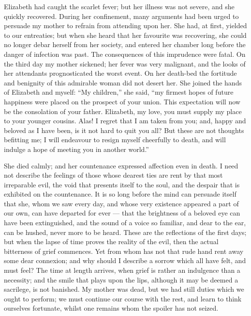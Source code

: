 Elizabeth had caught the scarlet
fever; but her illness was not severe,
and she quickly recovered. During
her confinement, many arguments had
been urged to persuade my mother to
refrain from attending upon her. She
had, at first, yielded to our entreaties;
but when she heard that her favourite
was recovering, she could no longer
debar herself from her society, and entered
her chamber long before the danger
of infection was past. The consequences
of this imprudence were fatal.
On the third day my mother sickened;
her fever was very malignant,
and the looks of her attendants prognosticated
the worst event. On her
death-bed the fortitude and benignity
of this admirable woman did not
desert her. She joined the hands of
Elizabeth and myself: ``My children,''
she said, ``my firmest hopes of future
happiness were placed on the prospect of
your union. This expectation will now
be the consolation of your father. Elizabeth,
my love, you must supply my
place to your younger cousins. Alas!
I regret that I am taken from you; and,
happy and beloved as I have been, is
it not hard to quit you all? But these
are not thoughts befitting me; I will
endeavour to resign myself cheerfully
to death, and will indulge a hope of
meeting you in another world.''

She died calmly; and her countenance
expressed affection even in death.
I need not describe the feelings of
those whose dearest ties are rent by
that most irreparable evil, the void
that presents itself to the soul, and the
despair that is exhibited on the countenance.
It is so long before the mind
can persuade itself that she, whom we
saw every day, and whose very existence
appeared a part of our own, can have
departed for ever --- that the brightness
of a beloved eye can have been extinguished,
and the sound of a voice so
familiar, and dear to the ear, can be
hushed, never more to be heard. These
are the reflections of the first days;
but when the lapse of time proves the
reality of the evil, then the actual bitterness
of grief commences. Yet from
whom has not that rude hand rent
away some dear connexion; and why
should I describe a sorrow which
all have felt, and must feel? The time
at length arrives, when grief is rather
an indulgence than a necessity; and
the smile that plays upon the lips, although
it may be deemed a sacrilege,
is not banished. My mother was dead,
but we had still duties which we ought
to perform; we must continue our
course with the rest, and learn to think
ourselves fortunate, whilst one remains
whom the spoiler has not seized.

